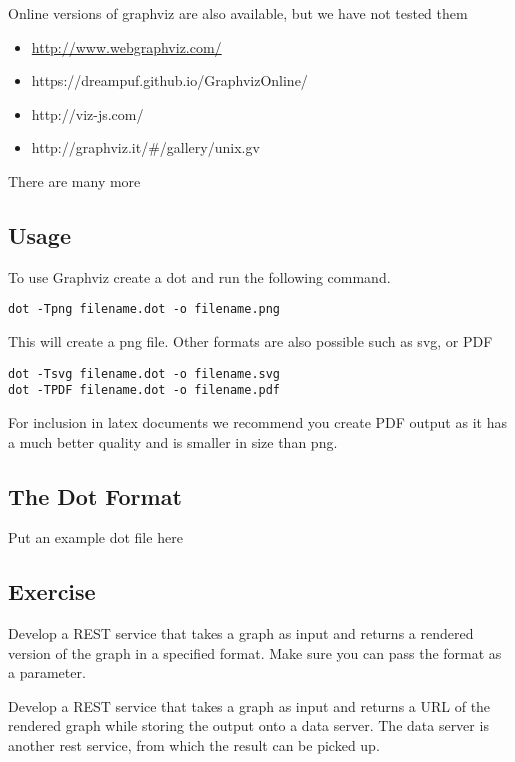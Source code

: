 Online versions of graphviz are also available, but we have not tested
them

\begin{itemize}
\item
  \url{http://www.webgraphviz.com/}
\item
  https://dreampuf.github.io/GraphvizOnline/
\item
  http://viz-js.com/
\item
  http://graphviz.it/\#/gallery/unix.gv
\end{itemize}

There are many more

\subsection{Usage}

To use Graphviz create a dot and run the following command.

\begin{lstlisting}
dot -Tpng filename.dot -o filename.png
\end{lstlisting}

This will create a png file. Other formats are also possible such as
svg, or PDF

\begin{lstlisting}
dot -Tsvg filename.dot -o filename.svg
dot -TPDF filename.dot -o filename.pdf
\end{lstlisting}

For inclusion in latex documents we recommend you create PDF output as
it has a much better quality and is smaller in size than png.

\subsection{The Dot Format}

Put an example dot file here

\subsection{Exercise}

\begin{exercise}
Develop a REST service that takes a graph as input and returns a rendered version of the graph in a specified format. Make sure you can pass the format as a parameter.
\end{exercise}

\begin{exercise}
Develop a REST service that takes a graph as input and returns a URL of the rendered graph while storing the output onto a data server. The data server is another rest service, from which the result can be picked up. 
\end{exercise}

